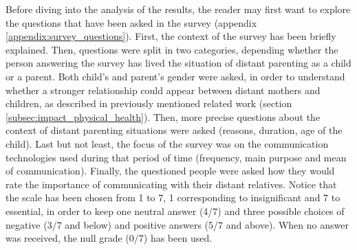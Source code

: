 Before diving into the analysis of the results, the reader may first want to explore the questions that have been asked in the survey (appendix \ref{appendix:survey_questions}). First, the context of the survey has been briefly explained. Then, questions were split in two categories, depending whether the person answering the survey has lived the situation of distant parenting as a child or a parent. Both child's and parent's gender were asked, in order to understand whether a stronger relationship could appear between distant mothers and children, as described in previously mentioned related work (section \ref{subsec:impact_physical_health}). Then, more precise questions about the context of distant parenting situations were asked (reasons, duration, age of the child). Last but not least, the focus of the survey was on the communication technologies used during that period of time (frequency, main purpose and mean of communication). Finally, the questioned people were asked how they would rate the importance of communicating with their distant relatives. Notice that the scale has been chosen from 1 to 7, 1 corresponding to insignificant and 7 to essential, in order to keep one neutral answer (4/7) and three possible choices of negative (3/7 and below) and positive answers (5/7 and above). When no answer was received, the null grade (0/7) has been used.

